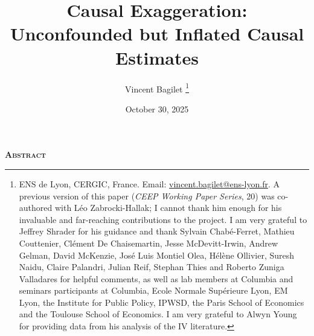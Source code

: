 \documentclass[usletter, 12pt]{article}
\begin{document}

	
	\title{Causal Exaggeration: \\ Unconfounded but Inflated Causal Estimates}

	\author{Vincent Bagilet
		\thanks{ENS de Lyon, CERGIC, France. Email: \url{vincent.bagilet@ens-lyon.fr}. 
			A previous version of this paper (\textit{CEEP Working Paper Series}, 20) was co-authored with Léo Zabrocki-Hallak; I cannot thank him enough for his invaluable and far-reaching contributions to the project. I am very grateful to Jeffrey Shrader for his guidance and thank Sylvain Chabé-Ferret, Mathieu Couttenier, Clément De Chaisemartin, Jesse McDevitt-Irwin, Andrew Gelman, David McKenzie, José Luis Montiel Olea, Hélène Ollivier, Suresh Naidu, Claire Palandri, Julian Reif, Stephan Thies and Roberto Zuniga Valladares for helpful comments, as well as lab members at Columbia and seminars participants at Columbia, Ecole Normale Supérieure Lyon, EM Lyon, the Institute for Public Policy, IPWSD, the Paris School of Economics and the Toulouse School of Economics. I am very grateful to Alwyn Young for providing data from his analysis of the IV literature.}
	}
	

	\date{October 30, 2025}
	
	\maketitle
	
	\begin{center}
		\large \textsc{\textbf{Abstract}}\\
	\end{center}
	
	
		
			
	
	
	\newpage
	


	
\end{document}
